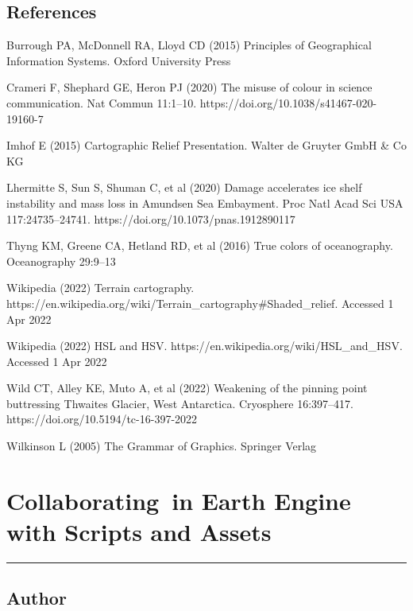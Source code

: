 \documentclass[
  letterpaper,
  DIV=11,
  numbers=noendperiod]{scrreprt}
\begin{document}
\hypertarget{references-14}{%
\section*{References}\label{references-14}}


Burrough PA, McDonnell RA, Lloyd CD (2015) Principles of Geographical
Information Systems. Oxford University Press

Crameri F, Shephard GE, Heron PJ (2020) The misuse of colour in science
communication. Nat Commun 11:1--10.
https://doi.org/10.1038/s41467-020-19160-7

Imhof E (2015) Cartographic Relief Presentation. Walter de Gruyter GmbH
\& Co KG

Lhermitte S, Sun S, Shuman C, et al (2020) Damage accelerates ice shelf
instability and mass loss in Amundsen Sea Embayment. Proc Natl Acad Sci
USA 117:24735--24741. https://doi.org/10.1073/pnas.1912890117

Thyng KM, Greene CA, Hetland RD, et al (2016) True colors of
oceanography. Oceanography 29:9--13

Wikipedia (2022) Terrain cartography.
https://en.wikipedia.org/wiki/Terrain\_cartography\#Shaded\_relief.
Accessed 1 Apr 2022

Wikipedia (2022) HSL and HSV.
https://en.wikipedia.org/wiki/HSL\_and\_HSV. Accessed 1 Apr 2022

Wild CT, Alley KE, Muto A, et al (2022) Weakening of the pinning point
buttressing Thwaites Glacier, West Antarctica. Cryosphere 16:397--417.
https://doi.org/10.5194/tc-16-397-2022

Wilkinson L (2005) The Grammar of Graphics. Springer Verlag

\hypertarget{collaborating-in-earth-engine-with-scripts-and-assets}{%
\chapter{Collaborating~in Earth Engine with Scripts and
Assets}\label{collaborating-in-earth-engine-with-scripts-and-assets}}

\begin{center}\rule{0.5\linewidth}{0.5pt}\end{center}

\hypertarget{author-20}{%
\section*{Author}\label{author-20}}
\end{document}
